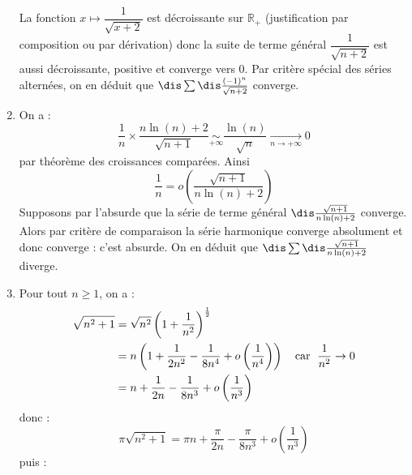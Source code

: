 \documentclass[a4paper,10pt]{report}
\begin{document}
\begin{enumerate}
\noindent La fonction $x \mapsto \dfrac{1}{\sqrt{x+2}}$ est décroissante sur $\mathbb{R}_+$ (justification par composition ou par dérivation) donc la suite de terme général $\dfrac{1}{\sqrt{n+2}}$ est aussi décroissante, positive et converge vers $0$. Par critère spécial des séries alternées, on en déduit que $\dis\sum \dis\frac{(-1)^n}{\sqrt{n+2}}$ converge.
\item On a :
$$ \frac{1}{n} \times \frac{n\ln(n)+2}{\sqrt{n+1}}  \underset{+ \infty}{\sim} \frac{\ln(n)}{\sqrt{n}} \underset{n \rightarrow + \infty}{\longrightarrow} 0$$
par théorème des croissances comparées. Ainsi 
$$ \frac{1}{n} = o \left(\frac{\sqrt{n+1}}{n\ln(n)+2} \right)$$
Supposons par l'absurde que la série de terme général $\dis \frac{\sqrt{n+1}}{n\ln(n)+2}$ converge. Alors par critère de comparaison la série harmonique converge absolument et donc converge : c'est absurde. On en déduit que $\dis\sum\dis\frac{\sqrt{n+1}}{n\ln(n)+2}$ diverge.
\item Pour tout $n \geq 1$, on a :
\begin{align*}
\sqrt {n^2 + 1} & = \sqrt{n^2} \left( 1 + \frac{1}{n^2} \right)^{\frac{1}{2}} \\
& = n \left(1 + \frac{1}{2n^2} - \frac{1}{8n^4} + o \left( \frac{1}{n^4} \right) \right) \quad \hbox{car } \; \frac{1}{n^2} \rightarrow 0\\
& = n + \frac{1}{2n} - \frac{1}{8n^3} +  o \left( \frac{1}{n^3} \right)  \\
\end{align*}
donc :
$$ \pi \sqrt {n^2 + 1} = \pi n + \frac{\pi}{2n} - \frac{\pi}{8n^3} +  o \left( \frac{1}{n^3} \right)  $$
puis :


\end{enumerate}
\end{document}
